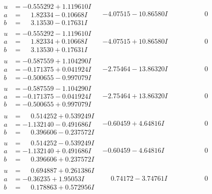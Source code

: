 \documentclass[1p]{elsarticle_modified}
\theoremstyle{definition}
\begin{document}
$$\begin{array}{c|c|c}
\begin{aligned}
u &= -0.555292 + 1.119610 I \\
a &= \phantom{-}1.82334 - 0.10668 I \\
b &= \phantom{-}3.13530 - 0.17631 I\end{aligned}
 & -4.07515 - 10.86580 I & \phantom{-0.000000 } 0 \\ \hline\begin{aligned}
u &= -0.555292 - 1.119610 I \\
a &= \phantom{-}1.82334 + 0.10668 I \\
b &= \phantom{-}3.13530 + 0.17631 I\end{aligned}
 & -4.07515 + 10.86580 I & \phantom{-0.000000 } 0 \\ \hline\begin{aligned}
u &= -0.587559 + 1.104290 I \\
a &= -0.171375 + 0.041924 I \\
b &= -0.500655 - 0.997079 I\end{aligned}
 & -2.75464 - 13.86320 I & \phantom{-0.000000 } 0 \\ \hline\begin{aligned}
u &= -0.587559 - 1.104290 I \\
a &= -0.171375 - 0.041924 I \\
b &= -0.500655 + 0.997079 I\end{aligned}
 & -2.75464 + 13.86320 I & \phantom{-0.000000 } 0 \\ \hline\begin{aligned}
u &= \phantom{-}0.514252 + 0.539249 I \\
a &= -1.132140 - 0.491686 I \\
b &= \phantom{-}0.396606 - 0.237572 I\end{aligned}
 & -0.60459 + 4.64816 I & \phantom{-0.000000 } 0 \\ \hline\begin{aligned}
u &= \phantom{-}0.514252 - 0.539249 I \\
a &= -1.132140 + 0.491686 I \\
b &= \phantom{-}0.396606 + 0.237572 I\end{aligned}
 & -0.60459 - 4.64816 I & \phantom{-0.000000 } 0 \\ \hline\begin{aligned}
u &= \phantom{-}0.694887 + 0.261386 I \\
a &= -0.36235 + 1.95053 I \\
b &= \phantom{-}0.178863 + 0.572956 I\end{aligned}
 & \phantom{-}0.74172 - 3.74761 I & \phantom{-0.000000 } 0 \\ \hline\begin{aligned}

\end{aligned}
\end{array}$$
\end{document}
